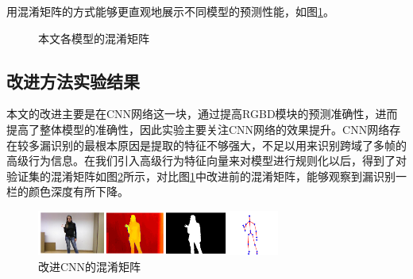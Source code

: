 \documentclass[a4paper, 12pt]{article}
\begin{document}
用混淆矩阵的方式能够更直观地展示不同模型的预测性能，如图\ref{fig:9}。
\begin{figure} \centering
{}
\caption{\label{fig:9}本文各模型的混淆矩阵}
\end{figure}

\subsection{改进方法实验结果}
本文的改进主要是在CNN网络这一块，通过提高RGBD模块的预测准确性，进而提高了整体模型的准确性，因此实验主要关注CNN网络的效果提升。CNN网络存在较多漏识别的最根本原因是提取的特征不够强大，不足以用来识别跨域了多帧的高级行为信息。在我们引入高级行为特征向量来对模型进行规则化以后，得到了对验证集的混淆矩阵如图\ref{fig:10}所示，对比图\ref{fig:9}中改进前的混淆矩阵，能够观察到漏识别一栏的颜色深度有所下降。
\begin{figure}[ht]
  \centering
  \includegraphics[width=8cm]{dataVisual.png}
  \caption{\label{fig:10}改进CNN的混淆矩阵}
\end{figure}
\end{document}
